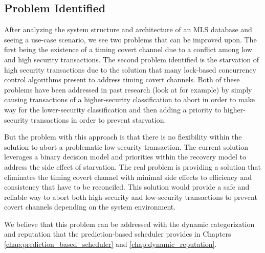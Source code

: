 \subsection{Problem Identified}
\label{mls:poblem_identified}
After analyzing the system structure and architecture of an \ac{MLS} database and seeing a use-case scenario, we see two problems that can be improved upon. The first being the existence of a timing covert channel due to a conflict among low and high security transactions. The second problem identified is the starvation of high security transactions due to the solution that many lock-based concurrency control algorithms present to address timing covert channels. Both of these problems have been addressed in past research (look at \cite{samarati_database_2016} for example) by simply causing transactions of a higher-security classification to abort in order to make way for the lower-security classification and then adding a priority to higher-security transactions in order to prevent starvation.

But the problem with this approach is that there is no flexibility within the solution to abort a problematic low-security transaction. The current solution leverages a binary decision model and priorities within the recovery model to address the side effect of starvation. The real problem is providing a solution that eliminates the timing covert channel with minimal side effects to efficiency and consistency that have to be reconciled. This solution would provide a safe and reliable way to abort both high-security and low-security transactions to prevent covert channels depending on the system environment.

We believe that this problem can be addressed with the dynamic categorization and reputation that the prediction-based scheduler provides in Chapters \ref{chap:prediction_based_scheduler} and \ref{chap:dynamic_reputation}.